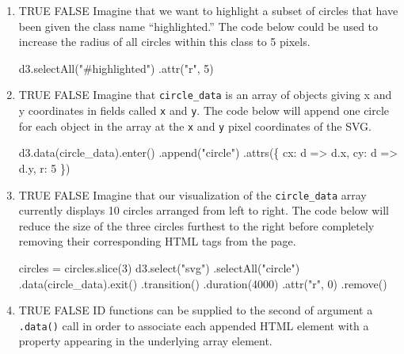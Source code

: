 \documentclass[
]{article}
\newenvironment{Shaded}{\begin{snugshade}}{\end{snugshade}}
\newcommand{\DecValTok}[1]{\textcolor[rgb]{0.00,0.00,0.81}{#1}}
\newcommand{\FunctionTok}[1]{\textcolor[rgb]{0.00,0.00,0.00}{#1}}
\newcommand{\NormalTok}[1]{#1}
\newcommand{\OtherTok}[1]{\textcolor[rgb]{0.56,0.35,0.01}{#1}}
\newcommand{\SpecialCharTok}[1]{\textcolor[rgb]{0.00,0.00,0.00}{#1}}
\newcommand{\StringTok}[1]{\textcolor[rgb]{0.31,0.60,0.02}{#1}}
\begin{document}
\begin{enumerate}
\def\labelenumi{\alph{enumi}.}
\item
  TRUE FALSE Imagine that we want to highlight a subset of circles that
  have been given the class name ``highlighted.'' The code below could
  be used to increase the radius of all circles within this class to 5
  pixels.

\begin{Shaded}
\begin{Highlighting}[]
\FunctionTok{d3.selectAll}\NormalTok{(}\StringTok{"\#highlighted"}\NormalTok{)}
  \FunctionTok{.attr}\NormalTok{(}\StringTok{"r"}\NormalTok{, }\DecValTok{5}\NormalTok{)}
\end{Highlighting}
\end{Shaded}
\item
  TRUE FALSE Imagine that \texttt{circle\_data} is an array of objects
  giving x and y coordinates in fields called \texttt{x} and \texttt{y}.
  The code below will append one circle for each object in the array at
  the \texttt{x} and \texttt{y} pixel coordinates of the SVG.

\begin{Shaded}
\begin{Highlighting}[]
\FunctionTok{d3.data}\NormalTok{(circle\_data)}\FunctionTok{.enter}\NormalTok{()}
  \FunctionTok{.append}\NormalTok{(}\StringTok{"circle"}\NormalTok{)}
  \FunctionTok{.attrs}\NormalTok{(\{}
\NormalTok{    cx}\SpecialCharTok{:}\NormalTok{ d }\SpecialCharTok{=\textgreater{}}\NormalTok{ d.x,}
\NormalTok{    cy}\SpecialCharTok{:}\NormalTok{ d }\SpecialCharTok{=\textgreater{}}\NormalTok{ d.y,}
\NormalTok{    r}\SpecialCharTok{:} \DecValTok{5}
\NormalTok{  \})}
\end{Highlighting}
\end{Shaded}
\item
  TRUE FALSE Imagine that our visualization of the \texttt{circle\_data}
  array currently displays 10 circles arranged from left to right. The
  code below will reduce the size of the three circles furthest to the
  right before completely removing their corresponding HTML tags from
  the page.

\begin{Shaded}
\begin{Highlighting}[]
\NormalTok{circles }\OtherTok{=} \FunctionTok{circles.slice}\NormalTok{(}\DecValTok{3}\NormalTok{)}
\FunctionTok{d3.select}\NormalTok{(}\StringTok{"svg"}\NormalTok{)}
  \FunctionTok{.selectAll}\NormalTok{(}\StringTok{"circle"}\NormalTok{)}
  \FunctionTok{.data}\NormalTok{(circle\_data)}\FunctionTok{.exit}\NormalTok{()}
  \FunctionTok{.transition}\NormalTok{()}
  \FunctionTok{.duration}\NormalTok{(}\DecValTok{4000}\NormalTok{)}
  \FunctionTok{.attr}\NormalTok{(}\StringTok{"r"}\NormalTok{, }\DecValTok{0}\NormalTok{)}
  \FunctionTok{.remove}\NormalTok{()}
\end{Highlighting}
\end{Shaded}
\item
  TRUE FALSE ID functions can be supplied to the second of argument a
  \texttt{.data()} call in order to associate each appended HTML element
  with a property appearing in the underlying array element.
\end{enumerate}
\end{document}
